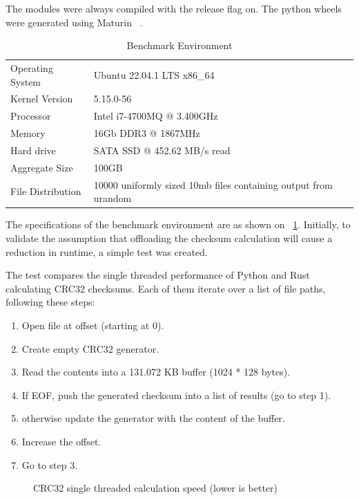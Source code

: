 The modules were always compiled with the release flag on.
The python wheels were generated using Maturin ~\cite{Maturin}.

\begin{table}[]
\begin{tabular}{ll}
Operating System  & Ubuntu 22.04.1 LTS x86\_64                                     \\
Kernel Version    & 5.15.0-56                                                      \\
Processor         & Intel i7-4700MQ @ 3.400GHz                                     \\
Memory            & 16Gb DDR3 @ 1867MHz                                             \\
Hard drive        & SATA SSD @ 452.62 MB/s read                                    \\
Aggregate Size    & 100GB                                                           \\
File Distribution & 10000 uniformly sized 10mb files containing output from urandom
\end{tabular}
\caption{Benchmark Environment}
\label{tab:checksum_tab_1}
\end{table}

The specifications of the benchmark environment are as shown on ~\ref{tab:checksum_tab_1}.
Initially, to validate the assumption that offloading the checksum calculation will cause a reduction
in runtime, a simple test was created.

The test compares the single threaded performance of Python and Rust calculating CRC32 checksums.
Each of them iterate over a list of file paths, following these steps:
\begin{enumerate}
    \item Open file at offset (starting at 0).
    \item Create empty CRC32 generator.
    \item Read the contents into a 131.072 KB buffer (1024 * 128 bytes).
    \item If EOF, push the generated checksum into a list of results (go to step 1).
    \item otherwise update the generator with the content of the buffer.
    \item Increase the offset.
    \item Go to step 3.
\end{enumerate}

\begin{figure}[H]
    \centering
    \begin{bchart}[step=50,max=350, unit=s]
        \medskip
    \end{bchart}
    \caption{CRC32 single threaded calculation speed (lower is better)}
    \label{fig:checksum_fig_2}
\end{figure}


